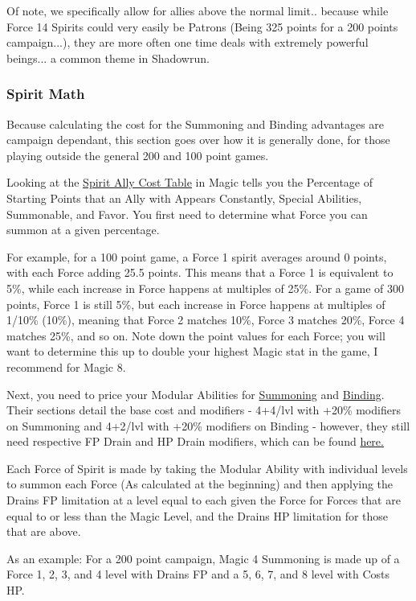 \begin{multicols*}{2}
	Of note, we specifically allow for allies above the normal limit.. because while Force 14 Spirits could very easily be Patrons (Being 325 points for a 200 points campaign...), they are more often one time deals with extremely powerful beings... a common theme in Shadowrun.
	
	\subsubsection{Spirit Math}\label{spirit_math}
	
	Because calculating the cost for the Summoning and Binding advantages are campaign dependant, this section goes over how it is generally done, for those playing outside the general 200 and 100 point games.
	
	Looking at the \hyperref[spirit_ally_cost]{Spirit Ally Cost Table} in Magic tells you the Percentage of Starting Points that an Ally with Appears Constantly, Special Abilities, Summonable, and Favor. You first need to determine what Force you can summon at a given percentage.
	
	For example, for a 100 point game, a Force 1 spirit averages around 0 points, with each Force adding 25.5 points. This means that a Force 1 is equivalent to 5\%, while each increase in Force happens at multiples of 25\%. For a game of 300 points, Force 1 is still 5\%, but each increase in Force happens at multiples of 1/10\% (10\%), meaning that Force 2 matches 10\%, Force 3 matches 20\%, Force 4 matches 25\%, and so on. Note down the point values for each Force; you will want to determine this up to double your highest Magic stat in the game, I recommend for Magic 8.
	
	Next, you need to price your Modular Abilities for \hyperref[summoning]{Summoning} and \hyperref[binding]{Binding}. Their sections detail the base cost and modifiers - 4+4/lvl with +20\% modifiers on Summoning and 4+2/lvl with +20\% modifiers on Binding - however, they still need respective FP Drain and HP Drain modifiers, which can be found \hyperref[drain_mods]{here.}
	
	Each Force of Spirit is made by taking the Modular Ability with individual levels to summon each Force (As calculated at the beginning) and then applying the Drains FP limitation at a level equal to each given the Force for Forces that are equal to or less than the Magic Level, and the Drains HP limitation for those that are above. 
	
	As an example: For a 200 point campaign, Magic 4 Summoning is made up of a Force 1, 2, 3, and 4 level with Drains FP and a 5, 6, 7, and 8 level with Costs HP. 
	

\end{multicols*}
